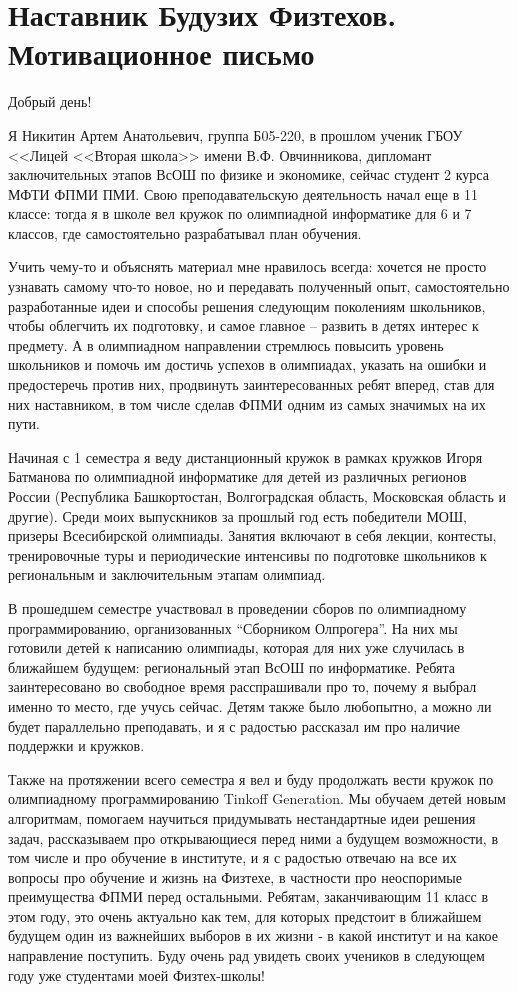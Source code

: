 \section{\textbf{Наставник Будузих Физтехов. Мотивационное письмо}}
\smallskip

\quad Добрый день!
\smallskip

\quad Я Никитин Артем Анатольевич, группа Б05-220, в прошлом ученик ГБОУ <<Лицей <<Вторая школа>> имени В.Ф. Овчинникова, дипломант
заключительных этапов ВсОШ по физике и экономике, сейчас студент 2 курса МФТИ ФПМИ ПМИ. Свою преподавательскую деятельность начал еще в 11
классе: тогда я в школе вел кружок по олимпиадной информатике для 6 и 7 классов, где самостоятельно разрабатывал план обучения.

\quad Учить чему-то и объяснять материал мне нравилось всегда: хочется не просто узнавать самому что-то новое, но и передавать полученный опыт,
самостоятельно разработанные идеи и способы решения следующим поколениям школьников, чтобы облегчить их подготовку, и самое главное – развить в
детях интерес к предмету. А в олимпиадном направлении стремлюсь повысить уровень школьников и помочь им достичь успехов в олимпиадах, указать
на ошибки и предостеречь против них, продвинуть заинтересованных ребят вперед, став для них наставником, в том числе сделав ФПМИ одним из самых
значимых на их пути.

\quad Начиная с 1 семестра я веду дистанционный кружок в рамках кружков Игоря Батманова по олимпиадной информатике для детей из различных
регионов России (Республика Башкортостан, Волгоградская область, Московская область и другие). Среди моих выпускников за прошлый год есть
победители МОШ, призеры Всесибирской олимпиады. Занятия включают в себя лекции, контесты, тренировочные туры и периодические интенсивы по
подготовке школьников к региональным и заключительным этапам олимпиад.

\quad В прошедшем семестре участвовал в проведении сборов по олимпиадному программированию, организованных “Сборником Олпрогера”. На них мы
готовили детей к написанию олимпиады, которая для них уже случилась в ближайшем будущем: региональный этап ВсОШ по информатике. Ребята
заинтересовано во свободное время расспрашивали про то, почему я выбрал именно то место, где учусь сейчас. Детям также было любопытно, а можно
ли будет параллельно преподавать, и я с радостью рассказал им про наличие поддержки и кружков.

\quad Также на протяжении всего семестра я вел и буду продолжать вести кружок по олимпиадному программированию Tinkoff Generation. Мы обучаем
детей новым алгоритмам, помогаем научиться придумывать нестандартные идеи решения задач, рассказываем про открывающиеся перед ними а будущем
возможности, в том числе и про обучение в институте, и я с радостью отвечаю на все их вопросы про обучение и жизнь на Физтехе, в частности про
неоспоримые преимущества ФПМИ перед остальными. Ребятам, заканчивающим 11 класс в этом году, это очень актуально как тем, для которых предстоит
в ближайшем будущем один из важнейших выборов в их жизни ‐ в какой институт и на какое направление поступить. Буду очень рад увидеть своих
учеников в следующем году уже студентами моей Физтех-школы!

